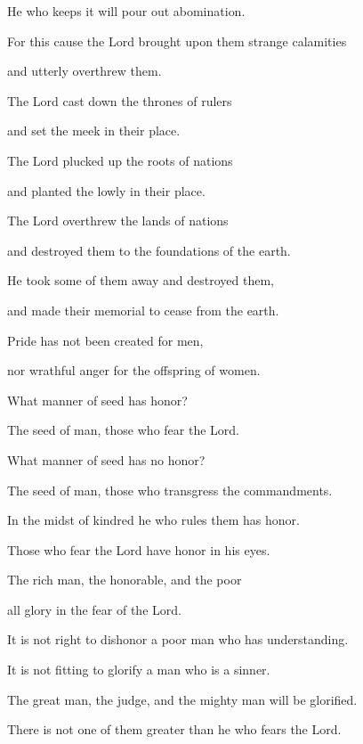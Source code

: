 {\par }{\QB He who keeps it will pour out abomination.
\par }{\Q For this cause the Lord brought upon them strange calamities
\par }{\QB and utterly overthrew them.
\par }{\Q {}The Lord cast down the thrones of rulers
\par }{\QB and set the meek in their place.
\par }{\Q {}The Lord plucked up the roots of nations
\par }{\QB and planted the lowly in their place.
\par }{\Q {}The Lord overthrew the lands of nations
\par }{\QB and destroyed them to the foundations of the earth.
\par }{\Q {}He took some of them away and destroyed them,
\par }{\QB and made their memorial to cease from the earth.
\par }{\Q {}Pride has not been created for men,
\par }{\QB nor wrathful anger for the offspring of women.
\par }{\BB \par }{\Q {}What manner of seed has honor?
\par }{\QB The seed of man, those who fear the Lord.
\par }{\Q What manner of seed has no honor?
\par }{\QB The seed of man, those who transgress the commandments.
\par }{\Q {}In the midst of kindred he who rules them has honor.
\par }{\QB Those who fear the Lord have honor in his eyes.
\par }{\Q {}The rich man, the honorable, and the poor
\par }{\QB all glory in the fear of the Lord.
\par }{\Q {}It is not right to dishonor a poor man who has understanding.
\par }{\QB It is not fitting to glorify a man who is a sinner.
\par }{\Q {}The great man, the judge, and the mighty man will be glorified.
\par }{\QB There is not one of them greater than he who fears the Lord.
}
